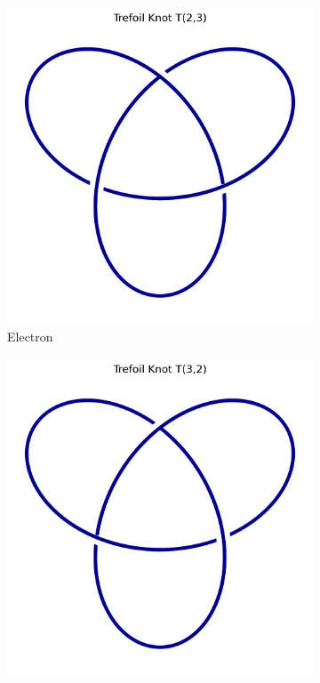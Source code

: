 \begin{figure}[H]
    \centering
    \begin{subfigure}[b]{0.3\textwidth}
        \includegraphics[width=\textwidth]{images/trefoil_knot_2.3}
        \caption{Electron}
    \end{subfigure}
    \hspace{1em}
    \begin{subfigure}[b]{0.3\textwidth}
        \includegraphics[width=\textwidth]{images/trefoil_knot_3.2}

\end{subfigure}
\end{figure}

